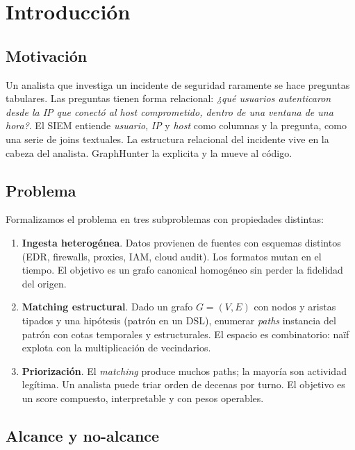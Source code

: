 \chapter{Introducción}
\label{sec:paper-intro}

\section{Motivación}

Un analista que investiga un incidente de seguridad raramente se
hace preguntas tabulares. Las preguntas tienen forma relacional:
\emph{¿qué usuarios autenticaron desde la IP que conectó al host
comprometido, dentro de una ventana de una hora?}. El SIEM entiende
\emph{usuario}, \emph{IP} y \emph{host} como columnas y la
pregunta, como una serie de joins textuales. La estructura
relacional del incidente vive en la cabeza del analista.
GraphHunter la explicita y la mueve al código.

\section{Problema}

Formalizamos el problema en tres subproblemas con propiedades
distintas:

\begin{enumerate}
    \item \textbf{Ingesta heterogénea}. Datos provienen de fuentes
    con esquemas distintos (EDR, firewalls, proxies, IAM, cloud
    audit). Los formatos mutan en el tiempo. El objetivo es un
    grafo canonical homogéneo sin perder la fidelidad del origen.
    \item \textbf{Matching estructural}. Dado un grafo
    $G = (V, E)$ con nodos y aristas tipados y una hipótesis
    (patrón en un DSL), enumerar \emph{paths} instancia del patrón
    con cotas temporales y estructurales. El espacio es
    combinatorio: naïf explota con la multiplicación de vecindarios.
    \item \textbf{Priorización}. El \emph{matching} produce muchos
    paths; la mayoría son actividad legítima. Un analista puede
    triar orden de decenas por turno. El objetivo es un score
    compuesto, interpretable y con pesos operables.
\end{enumerate}

\section{Alcance y no-alcance}

